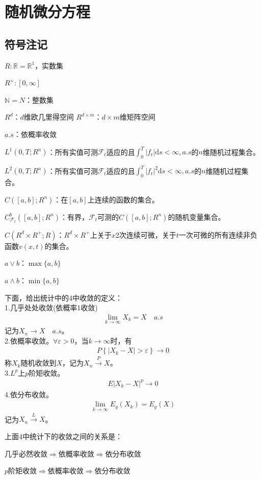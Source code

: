 % 
\chapter{随机微分方程}
\section{符号注记}
    \par
    $R:\mathbb{R} = \mathbb{R}^1$，实数集
    \par
    $R^+:[0,\infty]$
    \par
    $\mathbb{N} = N$：整数集
    \par
    $R^d$：$d$维欧几里得空间
    $R^{d\times m}$：$d\times m$维矩阵空间
    \par
    $a.s$：依概率收敛
    \par
    $L^1(0,T;R^n)$：所有实值可测$\mathcal{F}_t$适应的且$\int_0^T|f_t|\mathrm{d}s < \infty, a.s$的$n$维随机过程集合。
    \par
    $L^2(0,T;R^n)$：所有实值可测$\mathcal{F}_t$适应的且$\int_0^T|f_t|^2\mathrm{d}s < \infty, a.s$的$n$维随机过程集合。
    \par
    $C([a,b];R^n)$：在$[a,b]$上连续的函数的集合。
    \par
    $C_{\mathcal{F}_t}^b([a,b];R^n)$：有界，$\mathcal{F}_t$可测的$C([a,b];R^n)$的随机变量集合。
    \par
    $C(R^d\times R^+;R)$：$R^d\times R^+$上关于$x$2次连续可微，关于$t$一次可微的所有连续非负函数$v(x,t)$的集合。
    \par
    $a \vee b$：$\max\{a,b\}$
    \par
    $a\wedge b$：$\min\{a,b\}$
    \par
    下面，给出统计中的4中收敛的定义：\\
    1.几乎处处收敛(依概率1收敛)
    \begin{align*}
        \lim_{k \rightarrow \infty} X_k = X \quad a.s
    \end{align*}
    记为$X_n \rightarrow X \quad a.s$。\\
    2.依概率收敛。$\forall \varepsilon > 0$，当$k\rightarrow \infty$时，有
    \begin{align*}
        P\left\{ |X_k - X|  > \varepsilon\right\} \rightarrow 0
    \end{align*}
    称$X_k$随机收敛到$X$，记为$X_n \xrightarrow{P}X$。\\
    3.$L^p$上$p$阶矩收敛。
    \begin{align*}
        E|X_k - X|^p \rightarrow 0
    \end{align*}
    4.依分布收敛。
    \begin{align*}
    \lim_{k\rightarrow \infty} E_g(X_k) = E_g(X)
    \end{align*}
    记为$X_n\xrightarrow{L}X$。
    \par
    上面4中统计下的收敛之间的关系是：
    \par
    几乎必然收敛$\Rightarrow$依概率收敛$\Rightarrow$依分布收敛
    \par
    $p$阶矩收敛$\Rightarrow$依概率收敛$\Rightarrow$依分布收敛
